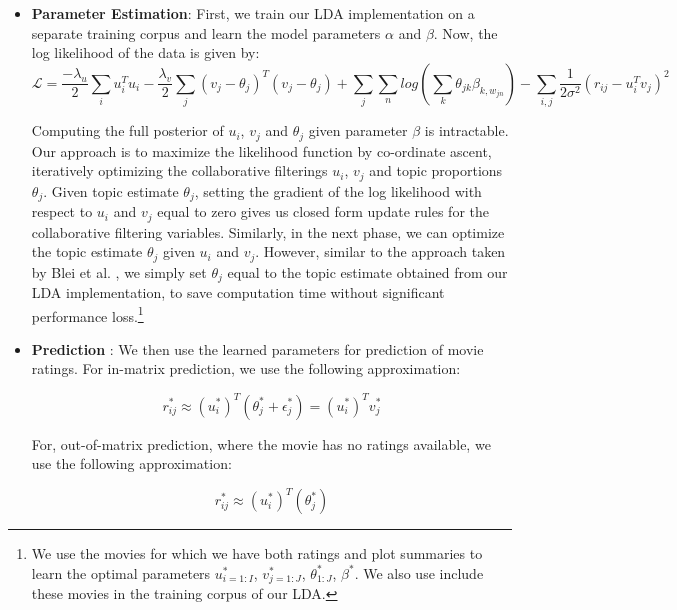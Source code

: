 \documentclass{article} %
\begin{document}
\begin{itemize}[leftmargin=*]

\item[] {\bf Parameter Estimation}: First, we train our LDA implementation on a separate training corpus and learn the model parameters $\alpha$ and $\beta$. 
Now, the log likelihood of the data is given by:
\begin{equation} \label{eq4}
\mathcal{L} = \frac{-\lambda_{u}}{2}\sum_{i}u_{i}^{T}u_{i} -
		\frac{\lambda_{v}}{2}\sum_{j}(v_{j}-\theta_{j})^{T}(v_{j}-\theta_{j})
		+ \sum_{j}\sum_{n}log(\sum_{k}\theta_{jk}\beta_{k,w_{jn}})
		- \sum_{i,j}\frac{1}{2\sigma^{2}}(r_{ij}-u_{i}^{T}v_{j})^{2}
\end{equation}

Computing the full posterior of $u_{i}$, $v_{j}$ and $\theta_{j}$ given
parameter $\beta$ is intractable. Our approach is to maximize the likelihood
function by co-ordinate ascent, iteratively optimizing the collaborative
filterings {$u_{i}$, $v_{j}$} and topic proportions $\theta_{j}$. Given
topic estimate $\theta_{j}$, setting the gradient of the log likelihood with 
respect to $u_{i}$ and $v_{j}$ equal to zero gives us closed form update rules
for the collaborative filtering variables. Similarly, in the next phase, we can
optimize the topic estimate $\theta_{j}$ given $u_{i}$ and $v_{j}$. However,
similar to the approach taken by Blei et al. \cite{ctr}, we simply set 
$\theta_{j}$ equal to the topic estimate obtained from our LDA implementation,
to save computation time without significant performance loss.\footnote{We 
use the movies for which we have both ratings and plot summaries to learn
the optimal parameters $u_{i=1:I}^{*}$, $v_{j=1:J}^{*}$, $\theta_{1:J}^{*}$,
$\beta^{*}$. We also use include these movies in the training corpus of our 
LDA.}

\item[] {\bf Prediction} : We then use the learned parameters for prediction
of movie ratings. For in-matrix prediction, we use the following approximation:

\begin{equation} \label{eq5}
r_{ij}^{*} \approx (u_{i}^{*})^{T}(\theta_{j}^{*}+\epsilon_{j}^{*}) = (u_{i}^{*})^{T}v_{j}^{*}
\end{equation}

For, out-of-matrix prediction, where the movie has no ratings available, we use 
the following approximation:

\begin{equation} \label{eq6}
r_{ij}^{*} \approx (u_{i}^{*})^{T}(\theta_{j}^{*})
\end{equation}

\end{itemize}
\end{document}
